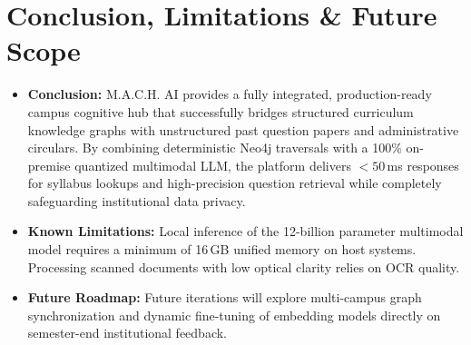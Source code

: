 \documentclass[11pt, a4paper]{article}
\begin{document}
\section{Conclusion, Limitations \& Future Scope}
\begin{itemize}[noitemsep, topsep=2pt]
    \item \textbf{Conclusion:} M.A.C.H. AI provides a fully integrated, production-ready campus cognitive hub that successfully bridges structured curriculum knowledge graphs with unstructured past question papers and administrative circulars. By combining deterministic Neo4j traversals with a 100\% on-premise quantized multimodal LLM, the platform delivers $<50$\,ms responses for syllabus lookups and high-precision question retrieval while completely safeguarding institutional data privacy.
    \item \textbf{Known Limitations:} Local inference of the 12-billion parameter multimodal model requires a minimum of 16\,GB unified memory on host systems. Processing scanned documents with low optical clarity relies on OCR quality.
    \item \textbf{Future Roadmap:} Future iterations will explore multi-campus graph synchronization and dynamic fine-tuning of embedding models directly on semester-end institutional feedback.
\end{itemize}

\end{document}
